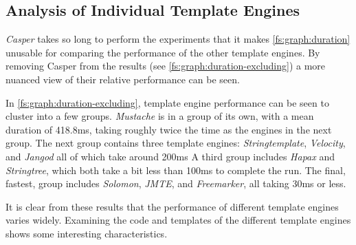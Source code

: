 \subsection{Analysis of Individual Template Engines}
\label{sub:individual template engines}

\emph{Casper} takes so long to perform the experiments that it makes \autoref{fs:graph:duration} unusable for comparing the performance of the other \gls{template engine}s. By removing Casper from the results (see \autoref{fs:graph:duration-excluding}) a more nuanced view of their relative performance can be seen.

In \autoref{fs:graph:duration-excluding}, \gls{template engine} performance can be seen to cluster into a few groups. \emph{Mustache} is in a group of its own, with a mean duration of 418.8ms, taking roughly twice the time as the engines in the next group. The next group contains three \gls{template engine}s: \emph{Stringtemplate}, \emph{Velocity}, and \emph{Jangod} all of which take around 200ms A third group includes \emph{Hapax} and \emph{Stringtree}, which both take a bit less than 100ms to complete the run. The final, fastest, group includes \emph{Solomon}, \emph{JMTE}, and \emph{Freemarker}, all taking 30ms or less.

It is clear from these results that the performance of different \gls{template engine}s varies widely. Examining the code and templates of the different template engines shows some interesting characteristics.

